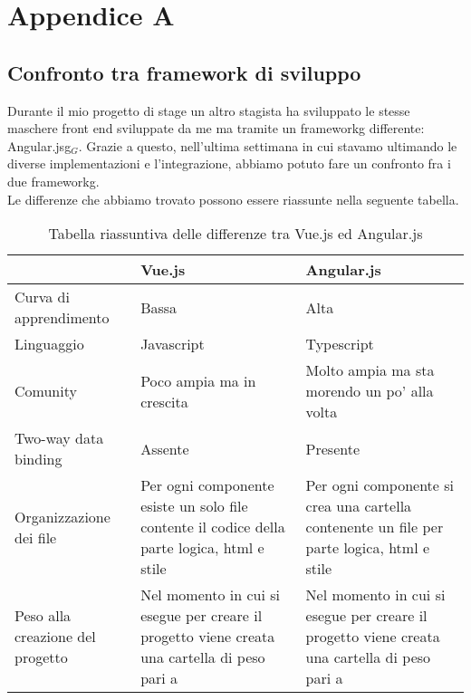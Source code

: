 
\chapter{Appendice A}

\section{Confronto tra framework di sviluppo}

Durante il mio progetto di stage un altro stagista ha sviluppato le stesse maschere front end sviluppate da me ma tramite un \gls{frameworkg} differente: \gls{Angular.jsg}$_G$. Grazie a questo, nell'ultima settimana in cui stavamo ultimando le diverse implementazioni e l'integrazione, abbiamo potuto fare un confronto fra i due \gls{frameworkg}.\\
Le differenze che abbiamo trovato possono essere riassunte nella seguente tabella.

\begin{table}[H]
	\caption{Tabella riassuntiva delle differenze tra Vue.js ed Angular.js}
	\label{tab:confronto-framework}
	\renewcommand{\arraystretch}{1.6}
	\begin{tabularx}{\textwidth}{lX|X}
		\hline\hline
		\textbf{} & \textbf{Vue.js} & \textbf{Angular.js}\\
		\hline
		Curva di apprendimento & Bassa & Alta \\
		\hline
		Linguaggio & Javascript & Typescript \\
		\hline
		Comunity & Poco ampia ma in crescita & Molto ampia ma sta morendo un po' alla volta \\
		\hline
		Two-way data binding & Assente & Presente \\
		\hline
		Organizzazione dei file & Per ogni componente esiste un solo file contente il codice della parte logica, html e stile & Per ogni componente si crea una cartella contenente un file per parte logica, html e stile \\
		\hline
		Peso alla creazione del progetto & Nel momento in cui si esegue per creare il progetto viene creata una cartella di peso pari a & Nel momento in cui si esegue per creare il progetto viene creata una cartella di peso pari a \\
		\hline
	\end{tabularx}
\end{table}%



